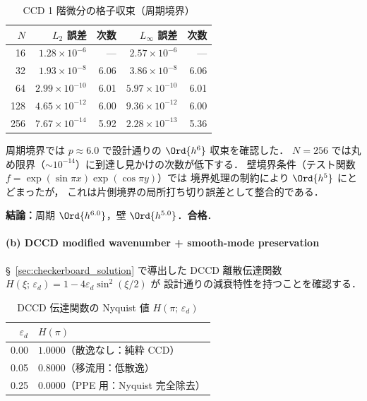 \begin{table}[htbp]
\centering
\caption{CCD 1 階微分の格子収束（周期境界）}
\label{tab:ccd_periodic}
\renewcommand{\arraystretch}{1.2}
\footnotesize
\begin{tabular}{rrrrr}
\toprule
$N$ & $L_2$ 誤差 & 次数 & $L_\infty$ 誤差 & 次数 \\
\midrule
 16 & $1.28 \times 10^{-6}$  & ---  & $2.57 \times 10^{-6}$  & ---  \\
 32 & $1.93 \times 10^{-8}$  & 6.06 & $3.86 \times 10^{-8}$  & 6.06 \\
 64 & $2.99 \times 10^{-10}$ & 6.01 & $5.97 \times 10^{-10}$ & 6.01 \\
128 & $4.65 \times 10^{-12}$ & 6.00 & $9.36 \times 10^{-12}$ & 6.00 \\
256 & $7.67 \times 10^{-14}$ & 5.92 & $2.28 \times 10^{-13}$ & 5.36 \\
\bottomrule
\end{tabular}
\end{table}

周期境界では $p \approx 6.0$ で設計通りの $\Ord{h^6}$ 収束を確認した．
$N = 256$ では丸め限界（$\sim 10^{-14}$）に到達し見かけの次数が低下する．
壁境界条件（テスト関数 $f = \exp(\sin\pi x)\exp(\cos\pi y)$）では
境界処理の制約により $\Ord{h^5}$ にとどまったが，
これは片側境界の局所打ち切り誤差として整合的である．

\noindent\textbf{結論：}周期 $\Ord{h^{6.0}}$，壁 $\Ord{h^{5.0}}$．\textbf{合格}．

\paragraph{(b) DCCD modified wavenumber + smooth-mode preservation}
\label{sec:verify_dccd_dissipation}
\label{sec:dccd_dissipation_bench}

§~\ref{sec:checkerboard_solution} で導出した DCCD 離散伝達関数
$H(\xi;\,\varepsilon_d) = 1 - 4\varepsilon_d \sin^2(\xi/2)$ が
設計通りの減衰特性を持つことを確認する．

\begin{table}[htbp]
\centering
\caption{DCCD 伝達関数の Nyquist 値 $H(\pi;\,\varepsilon_d)$}
\label{tab:dccd_transfer}
\renewcommand{\arraystretch}{1.2}
\footnotesize
\begin{tabular}{rl}
\toprule
$\varepsilon_d$ & $H(\pi)$ \\
\midrule
0.00 & $1.0000$（散逸なし：純粋 CCD）\\
0.05 & $0.8000$（移流用：低散逸）\\
0.25 & $0.0000$（PPE 用：Nyquist 完全除去）\\
\bottomrule
\end{tabular}
\end{table}

